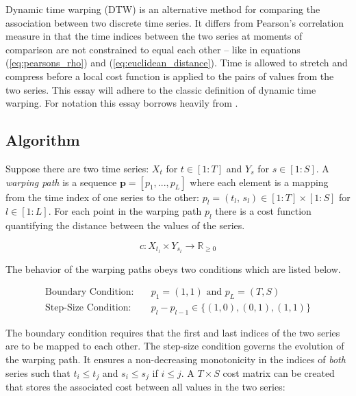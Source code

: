 \documentclass[12pt]{report}
\begin{document}
Dynamic time warping (DTW) is an alternative method for comparing the association between two discrete time series. It differs from Pearson's correlation measure in that the time indices between the two series at moments of comparison are not constrained to equal each other -- like in equations (\ref{eq:pearsons_rho}) and (\ref{eq:euclidean_distance}). Time is allowed to stretch and compress before a local cost function is applied to the pairs of values from the two series. This essay will adhere to the classic definition of dynamic time warping. For notation this essay borrows heavily from \cite{Mueller2007}.

\subsection{Algorithm} \label{sec:DTW_Algorithm}

Suppose there are two time series: $X_{t}$ for $t \in [1:T]$ and $Y_{s}$ for $s \in [1:S]$. A \emph{warping path} is a sequence $\boldsymbol{p} = [p_{1},..., p_{L}]$ where each element is a mapping from the time index of one series to the other: $p_{l} = (t_{l}, \, s_{l}) \in [1:T] \times [1:S]$ for $l \in [1:L]$. For each point in the warping path $p_{l}$ there is a cost function quantifying the distance between the values of the series.

\begin{equation} \label{eq:local_cost_function}
    c: X_{t_{l}} \times Y_{s_{l}} \rightarrow \mathbb{R}_{\ge 0}
\end{equation}

The behavior of the warping paths obeys two conditions which are listed below.

\begin{align}
    \text{Boundary Condition:} \quad & p_{1} = (1, 1) \text{ and } p_{L} = (T, S) \\ 
    \text{Step-Size Condition:} \quad& p_{l} - p_{l - 1} \in \{ (1, 0), (0, 1), (1, 1) \} \label{eq:dtw_condition}
\end{align}

The boundary condition requires that the first and last indices of the two series are to be mapped to each other. The step-size condition governs the evolution of the warping path. It ensures a non-decreasing monotonicity in the indices of \emph{both} series such that $t_{i} \le t_{j}$ and $s_{i} \le s_{j}$ if $i \le j$. A $T \times S$ cost matrix can be created that stores the associated cost between all values in the two series:
\end{document}
